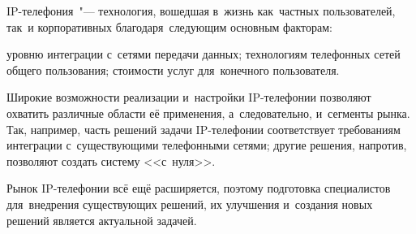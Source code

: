 
IP-телефония~"--- технология, вошедшая в~жизнь как~частных пользователей, так~и корпоративных благодаря~следующим основным факторам:
\begin{itemize}
     уровню интеграции с~сетями передачи данных;
		 технологиям телефонных сетей общего пользования;
		 стоимости услуг для~конечного пользователя.
\end{itemize}

Широкие возможности реализации и~настройки IP-телефонии позволяют охватить различные области её применения, а~следовательно, и~сегменты рынка.
Так, например, часть решений задачи IP-телефонии соответствует требованиям интеграции с~существующими телефонными сетями; другие решения, напротив, позволяют создать систему <<с~нуля>>.

Рынок IP-телефонии всё ещё расширяется, поэтому подготовка специалистов для~внедрения существующих решений, их улучшения и~создания новых решений является актуальной задачей.

